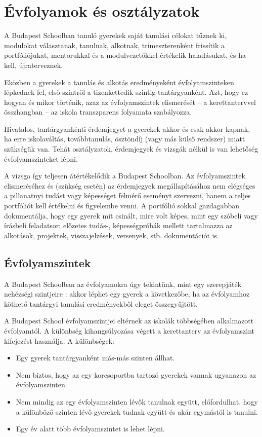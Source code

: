 \section{Évfolyamok és osztályzatok}
\label{sec:evfolyamok_osztalyzatok}
A Budapest Schoolban tanuló gyerekek saját tanulási célokat tűznek ki, modulokat
választanak, tanulnak, alkotnak, trimeszterenként frissítik a portfóliójukat,
mentorukkal és a modulvezetőkkel értékelik haladásukat, és ha kell,
újraterveznek.

Eközben a gyerekek a tanulás és alkotás eredményeként évfolyamszinteken
lépkednek fel,
első szintről a tizenkettedik szintig tantárgyanként.
Azt, hogy ez hogyan és mikor történik, azaz az évfolyamszintek elismerését -- a
kerettantervvel összhangban -- az iskola transzparens folyamata
szabályozza.

Hivatalos, tantárgyankénti érdemjegyet a gyerekek akkor és csak akkor kapnak,
ha erre iskolaváltás, továbbtanulás, ösztöndíj	    (vagy más külső rendszer)
miatt szükségük van.
Tehát osztályzatok, érdemjegyek és vizsgák nélkül is van lehetőség
évfolyamszinteket lépni.

A vizsga így teljesen átértékelődik a Budapest Schoolban.
Az évfolyamszintek elismeréséhez és (szükség esetén) az érdemjegyek
megállapításához
nem elégséges a pillanatnyi tudást vagy képességet felmérő eseményt szervezni,
hanem
a teljes portfóliót kell értékelni és figyelembe venni.
A portfólió sokkal gazdagabban dokumentálja, hogy egy gyerek mit csinált, mire
volt képes, mint egy szóbeli vagy írásbeli feladatsor: előzetes tudás-,
képességpróbák
mellett tartalmazza az alkotások, projektek, visszajelzések, versenyek, stb.
dokumentációt is.

\subsection{Évfolyamszintek}
\label{sec:evfolyamok}

A Budapest Schoolban az évfolyamokra úgy tekintünk, mint egy szerepjáték
nehézségi
szintjeire \citep{wiki:game_levels}: akkor léphet egy gyerek a következőbe, ha
az
évfolyamhoz köthető tantárgyi tanulási eredményekből eleget összegyűjtött.
  

A Budapest School évfolyamszintjei eltérnek az iskolák többségében alkalmazott
évfolyamtól. A különbség kihangsúlyozása végett a kerettanterv az évfolyamszint
kifejezést használja. A különbségek:

\begin{itemize}
      \item Egy gyerek tantárgyanként más-más szinten állhat.
      \item Nem biztos, hogy az egy korcsoportba tartozó gyerekek vannak
            ugyanazon az évfolyamszinten.

      \item Nem mindig az egy évfolyamszinten lévők tanulnak együtt,
            előfordulhat, hogy a különböző szinten lévő gyerekek tudnak együtt
            és akár
            egymástól is tanulni.

      \item Egy év alatt több évfolyamszintet is lehet lépni.
\end{itemize}


